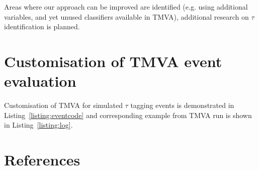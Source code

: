 \documentclass[a4paper]{jpconf}
\begin{document}
Areas where our approach can be improved are identified
(e.g. using additional variables, and yet unused classifiers available in TMVA), 
additional research on $\tau$ identification is planned.




\appendix %
\section{Customisation of TMVA event evaluation}

Customisation of TMVA for simulated $\tau$ tagging events is demonstrated in 
Listing~\ref{listing:eventcode} and corresponding example from TMVA run is
shown in Listing~\ref{listing:log}.




\newpage







\section*{References}
\end{document}
